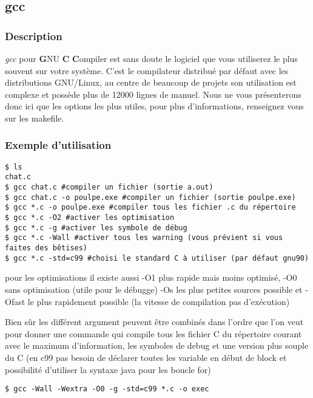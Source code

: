 \subsection*{gcc}
\subsubsection*{Description}
\emph{gcc} pour \textbf{G}NU \textbf{C} \textbf{C}ompiler est sans doute le logiciel que vous utiliserez le plus souvent sur votre système.
C'est le compilateur distribué par défaut avec les distributions GNU/Linux, au centre de beaucoup de projets son utilisation est complexe et possède plus de 12000 lignes de manuel.
Nous ne vous présenterons donc ici que les options les plus utiles,
pour plus d'informations, renseignez vous sur les makefile.

\subsubsection*{Exemple d'utilisation}

\begin{lstlisting}
$ ls
chat.c
$ gcc chat.c #compiler un fichier (sortie a.out)
$ gcc chat.c -o poulpe.exe #compiler un fichier (sortie poulpe.exe)
$ gcc *.c -o poulpe.exe #compiler tous les fichier .c du répertoire
$ gcc *.c -O2 #activer les optimisation 
$ gcc *.c -g #activer les symbole de débug
$ gcc *.c -Wall #activer tous les warning (vous prévient si vous faites des bêtises)
$ gcc *.c -std=c99 #choisi le standard C à utiliser (par défaut gnu90)
\end{lstlisting}

pour les optimisations il existe aussi -O1 plus rapide mais moins optimisé, -O0 sans optimisation (utile pour le débugge)  -Os les plus petites sources possible et -Ofast le plus rapidement possible (la vitesse de compilation pas d'exécution)

Bien sûr les différent argument peuvent être combinés dans l'ordre que l'on veut pour donner une commande qui compile tous les fichier C du répertoire courant avec le maximum d'information, les symboles de debug et une version plus souple du C (en c99 pas besoin de déclarer toutes les variable en début de block et possibilité d'utiliser la syntaxe java pour les boucle for)
\begin{lstlisting}
$ gcc -Wall -Wextra -O0 -g -std=c99 *.c -o exec
\end{lstlisting}
